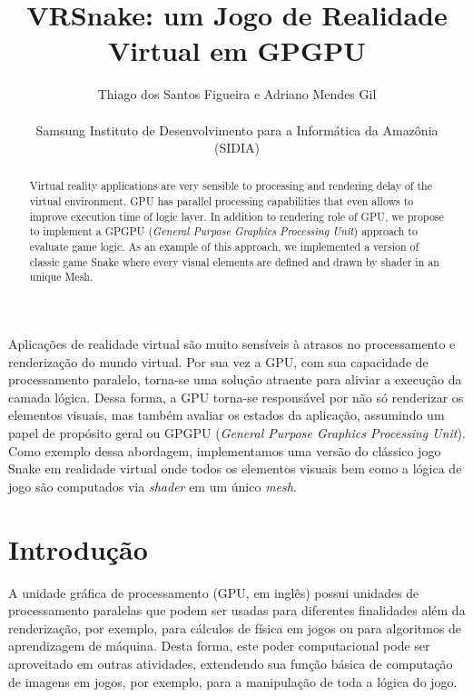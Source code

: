\documentclass{SBCbookchapter}
\author{Thiago dos Santos Figueira e Adriano Mendes Gil\\
\\
Samsung Instituto de Desenvolvimento para a Informática da Amazônia\\
(SIDIA)}
\title{VRSnake: um Jogo de Realidade Virtual em GPGPU}
\begin{document}
\maketitle


\begin{abstract}
 Virtual reality applications are very sensible to processing and rendering delay of the virtual environment. GPU has parallel processing capabilities that even allows to improve execution time of logic layer. In addition to rendering role of GPU, we propose to implement a GPGPU (\textit{General Purpose Graphics Processing Unit}) approach to evaluate game logic. As an example of this approach, we implemented a version of classic game Snake where every visual elements are defined and drawn by shader in an unique Mesh.
\end{abstract}

\begin{resumo}
\begin{otherlanguage}{brazilian}
Aplicações de realidade virtual são muito sensíveis à atrasos no processamento e renderização do mundo virtual.
Por sua vez a GPU, com sua capacidade de processamento paralelo, torna-se uma solução atraente para aliviar a execução da camada lógica. Dessa forma, a GPU torna-se responsável por não só renderizar os elementos visuais, mas também avaliar os estados da aplicação, assumindo um papel de propósito geral ou GPGPU (\textit{General Purpose Graphics Processing Unit}). Como exemplo dessa abordagem, implementamos uma versão do clássico jogo Snake em realidade virtual onde todos os elementos visuais bem como a lógica de jogo são computados via \textit{shader} em um único \textit{mesh}.
\end{otherlanguage}
\end{resumo}

\section{Introdução} \label{sec:introduction}

A unidade gráfica de processamento (GPU, em inglês) possui unidades de processamento paralelas \cite{DBLP:journals/corr/abs-1202-4347} que podem ser usadas para diferentes finalidades além da renderização, por exemplo, para cálculos de física em jogos ou para algoritmos de aprendizagem de máquina. Desta forma, este poder computacional pode ser aproveitado em outras atividades, extendendo sua função básica de computação de imagens em jogos, por exemplo, para a manipulação de toda a lógica do jogo.
\end{document}
